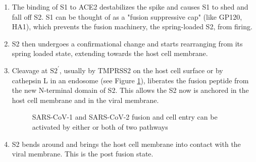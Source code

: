 \documentclass[11pt, oneside]{article}   	%
\begin{document}
\begin{enumerate}
\item The binding of S1 to ACE2 destabilizes the spike and causes S1 to shed and fall off S2. S1 can be thought of as a "fusion suppressive cap" (like GP120, HA1), which prevents 
the fusion machinery, the spring-loaded S2, from firing.

\item S2 then undergoes a confirmational change and starts rearranging from its spring loaded state, extending
towards the host cell membrane.

\item Cleavage at $\text{S2}^\prime$, usually by TMPRSS2 on the host cell surface or by cathepsin L in an endosome (see Figure \ref{fig:fusion}),  liberates the fusion peptide from the new N-terminal
domain of S2. This allows the S2 now is anchored in the host cell membrane and in the viral membrane.

\bigskip
\begin{figure} [H]
\caption{SARS-CoV-1 and SARS-CoV-2 fusion and cell entry can be activated by either or both of two pathways \cite{covid:cleavage}}
\label{fig:fusion}
\end{figure}

	
\item S2 bends around and brings the host cell membrane into contact
with the viral membrane. This is the post fusion state.
\end{enumerate}


\newpage


\end{document}
